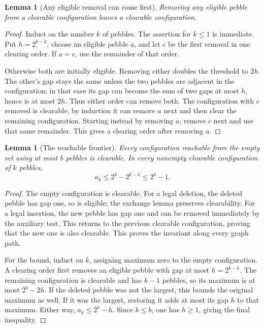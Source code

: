 \documentclass[11pt,a4paper,oneside,openany]{book}
\newtheorem{lemma}[theorem]{Lemma}
\theoremstyle{definition}\newtheorem{definition}[theorem]{Definition}
\theoremstyle{remark}\newtheorem{remark}[theorem]{Remark}
\numberwithin{equation}{chapter}
\begin{document}
\begin{lemma}[Any eligible removal can come first]
\label{tx:lem:order-clearance-exchange}
Removing any eligible pebble from a clearable configuration leaves a
clearable configuration.
\end{lemma}
\begin{proof}
Induct on the number $k$ of pebbles. The assertion for $k\le1$ is
immediate. Put $h=2^{b-k}$, choose an eligible pebble $a$, and let $c$
be the first removal in one clearing order. If $a=c$, use the remainder
of that order.

Otherwise both are initially eligible. Removing either doubles the
threshold to $2h$. The other's gap stays the same unless the two
pebbles are adjacent in the configuration; in that case its gap can
become the sum of two gaps at most $h$, hence is at most $2h$. Thus either order
can remove both. The configuration with $c$ removed is clearable;
by induction it can remove $a$ next and then clear the remaining
configuration. Starting instead by removing $a$, remove $c$ next and
use that same remainder. This gives a clearing order after removing $a$.
\end{proof}

\begin{lemma}[The reachable frontier]
\label{tx:lem:order-pebble-frontier}
Every configuration reachable from the empty set using at most $b$
pebbles is clearable. In every nonempty clearable configuration of
$k$ pebbles,
\begin{equation}\label{tx:eq:order-pebble-frontier}
                     a_k\le2^b-2^{b-k}\le2^b-1.
\end{equation}
\end{lemma}
\begin{proof}
The empty configuration is clearable. For a legal deletion, the
deleted pebble has gap one, so is eligible; the exchange lemma preserves
clearability. For a legal insertion, the new pebble has gap one and
can be removed immediately by the auxiliary test. This returns to the
previous clearable configuration, proving that the new one is also
clearable. This proves the invariant along every graph path.

For the bound, induct on $k$, assigning maximum zero to the empty
configuration. A clearing order first removes an eligible pebble with
gap at most $h=2^{b-k}$. The remaining configuration is clearable and
has $k-1$ pebbles, so its maximum is at most $2^b-2h$. If the deleted
pebble was not the largest, this bounds the original maximum as well.
If it was the largest, restoring it adds at most its gap $h$ to that
maximum. Either way, $a_k\le2^b-h$. Since $k\le b$, one has $h\ge1$,
giving the final inequality.
\end{proof}
\end{document}
